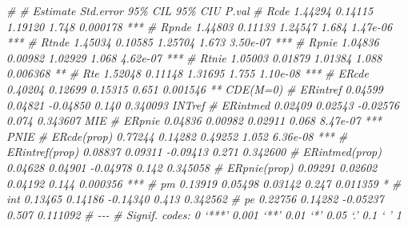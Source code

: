 \documentclass[
]{book}
\newenvironment{Shaded}{\begin{snugshade}}{\end{snugshade}}
\newcommand{\CommentTok}[1]{\textcolor[rgb]{0.56,0.35,0.01}{\textit{#1}}}
\begin{document}
\begin{Shaded}
\begin{Highlighting}[]
\CommentTok{\#}
\CommentTok{\# Estimate Std.error  95\% CIL 95\% CIU    P.val}
\CommentTok{\#   Rcde            1.44294   0.14115  1.19120   1.748 0.000178 ***}
\CommentTok{\#   Rpnde           1.44803   0.11133  1.24547   1.684 1.47e{-}06 ***}
\CommentTok{\#   Rtnde           1.45034   0.10585  1.25704   1.673 3.50e{-}07 ***}
\CommentTok{\#   Rpnie           1.04836   0.00982  1.02929   1.068 4.62e{-}07 ***}
\CommentTok{\#   Rtnie           1.05003   0.01879  1.01384   1.088 0.006368 **}
\CommentTok{\#   Rte             1.52048   0.11148  1.31695   1.755 1.10e{-}08 ***}
\CommentTok{\#   ERcde           0.40204   0.12699  0.15315   0.651 0.001546 **  CDE(M=0)}
\CommentTok{\#   ERintref        0.04599   0.04821 {-}0.04850   0.140 0.340093     INTref}
\CommentTok{\#   ERintmed        0.02409   0.02543 {-}0.02576   0.074 0.343607     MIE}
\CommentTok{\#   ERpnie          0.04836   0.00982  0.02911   0.068 8.47e{-}07 *** PNIE}
\CommentTok{\#   ERcde(prop)     0.77244   0.14282  0.49252   1.052 6.36e{-}08 ***}
\CommentTok{\#   ERintref(prop)  0.08837   0.09311 {-}0.09413   0.271 0.342600}
\CommentTok{\#   ERintmed(prop)  0.04628   0.04901 {-}0.04978   0.142 0.345058}
\CommentTok{\#   ERpnie(prop)    0.09291   0.02602  0.04192   0.144 0.000356 ***}
\CommentTok{\#   pm              0.13919   0.05498  0.03142   0.247 0.011359 *}
\CommentTok{\#   int             0.13465   0.14186 {-}0.14340   0.413 0.342562}
\CommentTok{\#   pe              0.22756   0.14282 {-}0.05237   0.507 0.111092}
\CommentTok{\#   {-}{-}{-}}
\CommentTok{\#   Signif. codes:  0 ‘***’ 0.001 ‘**’ 0.01 ‘*’ 0.05 ‘.’ 0.1 ‘ ’ 1}



\end{Highlighting}
\end{Shaded}
\end{document}
